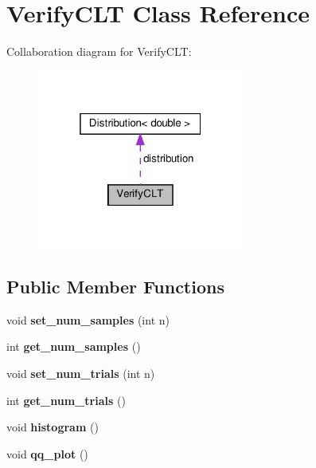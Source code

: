 \hypertarget{class_verify_c_l_t}{}\section{Verify\+C\+LT Class Reference}
\label{class_verify_c_l_t}


Collaboration diagram for Verify\+C\+LT\+:
\nopagebreak
\begin{figure}[H]
\begin{center}
\leavevmode
\includegraphics[width=193pt]{class_verify_c_l_t__coll__graph}
\end{center}
\end{figure}
\subsection*{Public Member Functions}
\begin{DoxyCompactItemize}
\item 
\mbox{\label{class_verify_c_l_t_a74ff104685619dc300c4df913de8b784}} 
void {\bfseries set\+\_\+num\+\_\+samples} (int n)
\item 
\mbox{\label{class_verify_c_l_t_ac7b6d9e8c6fa5af0ec0a65d336079aab}} 
int {\bfseries get\+\_\+num\+\_\+samples} ()
\item 
\mbox{\label{class_verify_c_l_t_a001bc8b46a677aa50fc012de3959d8d1}} 
void {\bfseries set\+\_\+num\+\_\+trials} (int n)
\item 
\mbox{\label{class_verify_c_l_t_af14925645c905b040f32cd65fcd3fe14}} 
int {\bfseries get\+\_\+num\+\_\+trials} ()
\item 
\mbox{\label{class_verify_c_l_t_ad1ba3f5a9867ec43ade06ea58cb0c30e}} 
void {\bfseries histogram} ()
\item 
\mbox{\label{class_verify_c_l_t_a21c6be46ba54c7b9719dd84533210886}} 
void {\bfseries qq\+\_\+plot} ()
\end{DoxyCompactItemize}
